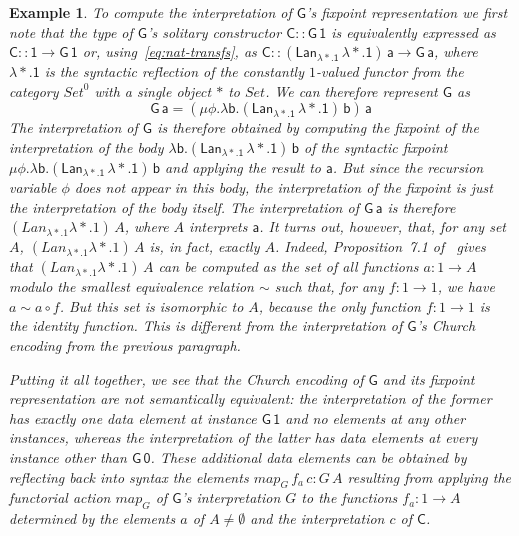 \documentclass[submission,copyright,creativecommons]{eptcs}
\newtheorem{example}[thm]{Example}
\newcommand{\set}{\mathsf{Set}}
\begin{document}
\begin{example}
To compute the interpretation of $\mathsf{G}$'s fixpoint
representation we first note that the type of $\mathsf{G}$'s solitary
constructor $\mathsf{C :: G\,1}$ is equivalently expressed as
$\mathsf{C :: 1 \to G\,1}$ or, using~\eqref{eq:nat-transfs}, as
$\mathsf{C :: (Lan_{\lambda *. 1}\,\lambda *. 1)\,a \to G\, a}$, where
$\mathsf{\lambda *. 1}$ is the syntactic reflection of the constantly
$1$-valued functor from the category $\mathit{Set}^0$ with a single
object $*$ to $\mathit{Set}$. We can therefore represent $\mathsf{G}$
as
\[\mathsf{G\,a} = \mathsf{(\mu \phi. \lambda b.
 (Lan_{\lambda *. 1} \,\lambda *.  1)\,b)\,a}\] The interpretation of
$\mathsf{G}$ is therefore obtained by computing the fixpoint of the
interpretation of the body $\mathsf{\lambda b. (Lan_{\lambda *. 1}
  \,\lambda *. 1)\,b}$ of the syntactic fixpoint $\mathsf{\mu
  \phi. \lambda b.  (Lan_{\lambda *. 1} \,\lambda *.  1)\,b}$ and
applying the result to $\mathsf{a}$. But since the recursion variable
$\mathsf{\phi}$ does not appear in this body, the interpretation of
the fixpoint is just the interpretation of the body itself.  The
interpretation of $\mathsf{G\,a}$ is therefore $(\mathit{Lan}_{\lambda
  *. 1} \lambda *. 1)\, A$, where $A$ interprets $\mathsf{a}$.
It turns out, however, that, for any set $A$, $(\mathit{Lan}_{\lambda
  *. 1} \lambda *. 1)\,A$ is, in fact, exactly $A$. Indeed,
Proposition~7.1 of~\cite{blw03} gives that $(\mathit{Lan}_{\lambda
  *. 1} \lambda *. 1)\,A$ can be computed as the set of all functions
$a : 1 \to A$ modulo the smallest equivalence relation $\sim$ such
that, for any $f : 1 \to 1$, we have $a \sim a \circ f$.  But this set
is isomorphic to $A$, because the only function $f : 1 \to 1$ is the
identity function. This is different from the interpretation of
$\mathsf{G}$'s Church encoding from the previous paragraph.

Putting it all together, we see that the Church encoding of
$\mathsf{G}$ and its fixpoint representation are not semantically
equivalent: the interpretation of the former has exactly one data
element at instance $\mathsf{G\,1}$ and no elements at any other
instances, whereas the interpretation of the latter has data elements
at every instance other than $\mathsf{G\,0}$.
These additional data elements can be obtained by reflecting back into
syntax the elements $\mathit{map}_G\,f_a\,c : G\,A$ resulting from
applying the functorial action $\mathit{map}_G$ of $\mathsf{G}$'s
interpretation $G$ to the functions $f_a : 1 \to A$ determined by the
elements $a$ of $A \not = \emptyset$ and the interpretation $c$ of
$\mathsf{C}$.
\end{example}
\end{document}
